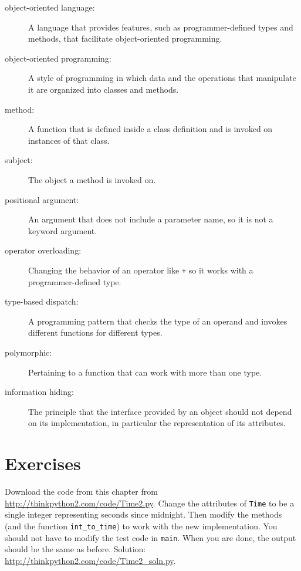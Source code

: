 \documentclass[10pt]{book}
\begin{document}
\begin{description}

\item[object-oriented language:] A language that provides features,
  such as programmer-defined types and methods, that facilitate
  object-oriented programming.

\item[object-oriented programming:] A style of programming in which
data and the operations that manipulate it are organized into classes
and methods.

\item[method:] A function that is defined inside a class definition and
is invoked on instances of that class.

\item[subject:] The object a method is invoked on.

\item[positional argument:]  An argument that does not include
a parameter name, so it is not a keyword argument.

\item[operator overloading:] Changing the behavior of an operator like
{\tt +} so it works with a programmer-defined type.

\item[type-based dispatch:] A programming pattern that checks the type
of an operand and invokes different functions for different types.

\item[polymorphic:] Pertaining to a function that can work with more
  than one type.  

\item[information hiding:] The principle that the interface provided 
by an object should not depend on its implementation, in particular
the representation of its attributes.

\end{description}


\section{Exercises}

\begin{exercise}

Download the code from this chapter from
\url{http://thinkpython2.com/code/Time2.py}.  Change the attributes of
    {\tt Time} to be a single integer representing seconds since
    midnight.  Then modify the methods (and the function
    \verb"int_to_time") to work with the new implementation.  You
    should not have to modify the test code in {\tt main}.  When you
    are done, the output should be the same as before.  Solution:
    \url{http://thinkpython2.com/code/Time2_soln.py}.

\end{exercise}
\end{document}
